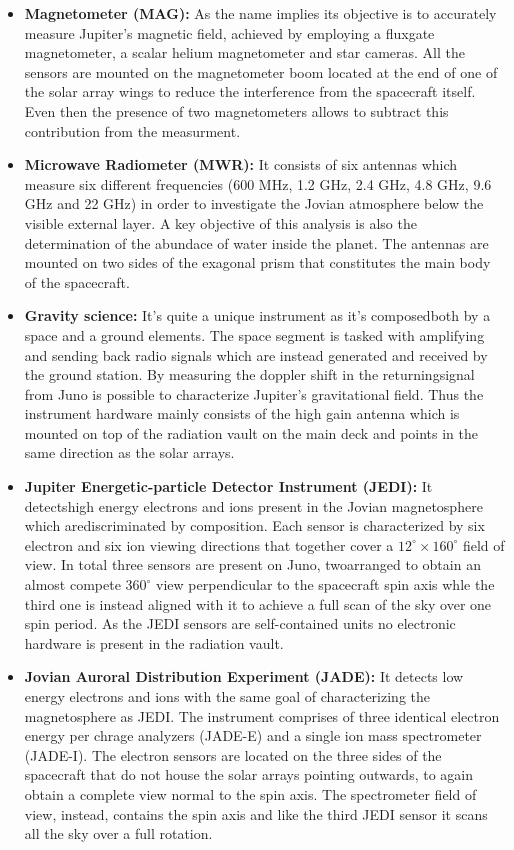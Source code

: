 \begin{itemize}
    \item \textbf{Magnetometer (MAG):} As the name implies its objective is to accurately measure Jupiter's magnetic field, achieved by employing a fluxgate magnetometer, a scalar helium magnetometer and star cameras. All the sensors are mounted on the magnetometer boom located at the end of one of the solar array wings to reduce the interference from the spacecraft itself. Even then the presence of two magnetometers allows to subtract this contribution from the measurment.
    
    \item \textbf{Microwave Radiometer (MWR):} It consists of six antennas which measure six different frequencies (600 MHz, 1.2 GHz, 2.4 GHz, 4.8 GHz, 9.6 GHz and 22 GHz) in order to investigate the Jovian atmosphere below the visible external layer. A key objective of this analysis is also the determination of the abundace of water inside the planet. The antennas are mounted on two sides of the exagonal prism that constitutes the main body of the spacecraft.
    
    \item \textbf{Gravity science:} It's quite a unique instrument as it's composedboth by a space and a ground elements. The space segment is tasked with amplifying and sending back radio signals which are instead generated and received by the ground station. By measuring the doppler shift in the returningsignal from Juno is possible to characterize Jupiter's gravitational field. Thus the instrument hardware mainly consists of the high gain antenna which is mounted on top of the radiation vault on the main deck and points in the same direction as the solar arrays.
    
    \item \textbf{Jupiter Energetic-particle Detector Instrument (JEDI):} It detectshigh energy electrons and ions present in the Jovian magnetosphere which arediscriminated by composition. Each sensor is characterized by six electron and six ion viewing directions that together cover a \(12^{\circ} \times 160^{\circ}\) field of view. In total three sensors are present on Juno, twoarranged to obtain an almost compete \(360^{\circ}\) view perpendicular to the spacecraft spin axis whle the third one is instead aligned with it to achieve a full scan of the sky over one spin period. As the JEDI sensors are self-contained units no electronic hardware is present in the radiation vault.

    \item \textbf{Jovian Auroral Distribution Experiment (JADE):} It detects low energy electrons and ions with the same goal of characterizing the magnetosphere as JEDI. The instrument comprises of three identical electron energy per chrage analyzers (JADE-E) and a single ion mass spectrometer (JADE-I). The electron sensors are located on the three sides of the  spacecraft that do not house the solar arrays pointing outwards, to again obtain a complete view normal to the spin axis. The spectrometer field of view, instead, contains the spin axis and like the third JEDI sensor it scans all the sky over a full rotation.
    

\end{itemize}
